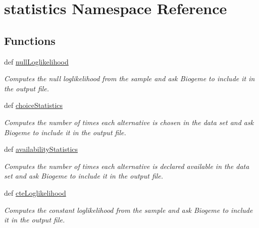 \hypertarget{namespacestatistics}{\section{statistics Namespace Reference}
\label{namespacestatistics}
}
\subsection*{Functions}
\begin{DoxyCompactItemize}
\item 
def \hyperlink{namespacestatistics_a36e39c9efbe7010620ff303c2b3626e7}{null\+Loglikelihood}
\begin{DoxyCompactList}\small\item\em Computes the null loglikelihood from the sample and ask Biogeme to include it in the output file. \end{DoxyCompactList}\item 
def \hyperlink{namespacestatistics_a4167098c8b95a0f5dbae6ae3fc72643b}{choice\+Statistics}
\begin{DoxyCompactList}\small\item\em Computes the number of times each alternative is chosen in the data set and ask Biogeme to include it in the output file. \end{DoxyCompactList}\item 
def \hyperlink{namespacestatistics_a6e63004ff1ea899ebf75c21f42470cdb}{availability\+Statistics}
\begin{DoxyCompactList}\small\item\em Computes the number of times each alternative is declared available in the data set and ask Biogeme to include it in the output file. \end{DoxyCompactList}\item 
def \hyperlink{namespacestatistics_abc7878bf7b77881ed5aee5a28e1cc43e}{cte\+Loglikelihood}
\begin{DoxyCompactList}\small\item\em Computes the constant loglikelihood from the sample and ask Biogeme to include it in the output file. \end{DoxyCompactList}\end{DoxyCompactItemize}


